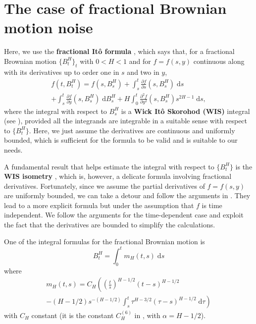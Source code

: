 \documentclass[reqno,12pt]{amsart}
\theoremstyle{plain}%
\theoremstyle{definition}
\begin{document}
\section{The case of fractional Brownian motion noise}

Here, we use the \textbf{fractional It\^o formula} \cite[Theorem 4.2.6]{BHOB2008}, which says that, for a fractional Brownian motion $\{B^H_t\}_t$ with $0 < H < 1$ and for $f=f(s, y)$ continuous along with its derivatives up to order one in $s$ and two in $y$,
\begin{multline*}
    f(t, B^H_t) = f(s, B^H_s) + \int_s^t \frac{\partial f}{\partial s}(s, B^H_s)\;\mathrm{d}s \\
        + \int_s^t \frac{\partial f}{\partial y}(s, B^H_s)\;\mathrm{d}B^H_s + H \int_0^t \frac{\partial^2 f}{\partial y^2}(s, B^H_s)s^{2H - 1}\;\mathrm{d}s,
\end{multline*}
where the integral with respect to $B^H_s$ is a \textbf{Wick It\^o Skorohod (WIS)} integral (see \cite[Chapter 4]{BHOB2008}), 
provided all the integrands are integrable in a suitable sense with respect to $\{B^H_t\}$. Here, we just assume the derivatives are continuous and uniformly bounded, which is sufficient for the formula to be valid and is suitable to our needs.

A fundamental result that helps estimate the integral with respect to $\{B^H_t\}$ is the \textbf{WIS isometry} \cite[Theorem 4.5.6]{BHOB2008}, which is, however, a delicate formula involving fractional derivatives. Fortunately, since we assume the partial derivatives of $f=f(s, y)$ are uniformly bounded, we can take a detour and follow the arguments in \cite[Theorem 2.7.4]{Mishura2008}. They lead to a more explicit formula but under the assumption that $f$ is time independent. We follow the arguments for the time-dependent case and exploit the fact that the derivatives are bounded to simplify the calculations.

One of the integral formulas for the fractional Brownian motion is \cite[Section 1.8]{Mishura2008}
\[
    B^H_t = \int_0^t m_H(t, s) \;\mathrm{d}s
\]
where
\begin{multline*}
    m_H(t, s) = C_H \left( \left(\frac{t}{s}\right)^{H-1/2} (t - s)^{H - 1/2} \right. \\ \left. - (H-1/2)s^{-(H-1/2)}\int_s^t\tau^{H-3/2}(\tau - s)^{H - 1/2}\;\mathrm{d}\tau\right)
\end{multline*}
with $C_H$ constant (it is the constant $C_H^{(6)}$ in \cite[Section 1.8]{Mishura2008}, with $\alpha = H - 1/2$).
\end{document}
